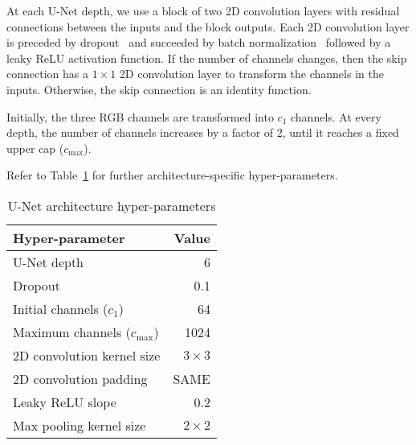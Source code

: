 At each U-Net depth, we use a block of two 2D convolution layers with residual connections between the inputs and the block outputs.
Each 2D convolution layer is preceded by dropout~\cite{dropout} and succeeded by batch normalization~\cite{batch-norm} followed by a leaky ReLU activation function.
If the number of channels changes, then the skip connection has a $1 \times 1$ 2D convolution layer to transform the channels in the inputs.
Otherwise, the skip connection is an identity function.

Initially, the three RGB channels are transformed into $c_1$ channels.
At every depth, the number of channels increases by a factor of 2, until it reaches a fixed upper cap ($c_\mathrm{max}$).%

Refer to Table~\ref{tab:unet-hyper-params} for further architecture-specific hyper-parameters.

\begin{table}[h]
    \centering
    \caption{U-Net architecture hyper-parameters}%
    \label{tab:unet-hyper-params}
    \begin{tabular}{l r}
        \toprule
        Hyper-parameter & Value \\
        \midrule
        U-Net depth & 6 \\
        Dropout & 0.1 \\
        Initial channels ($c_1$) & 64 \\
        Maximum channels ($c_\mathrm{max}$) & 1024 \\%
        2D convolution kernel size & $3 \times 3$ \\
        2D convolution padding & SAME \\
        Leaky ReLU slope & 0.2 \\
        Max pooling kernel size & $2 \times 2$ \\
        \bottomrule
    \end{tabular}
\end{table}
